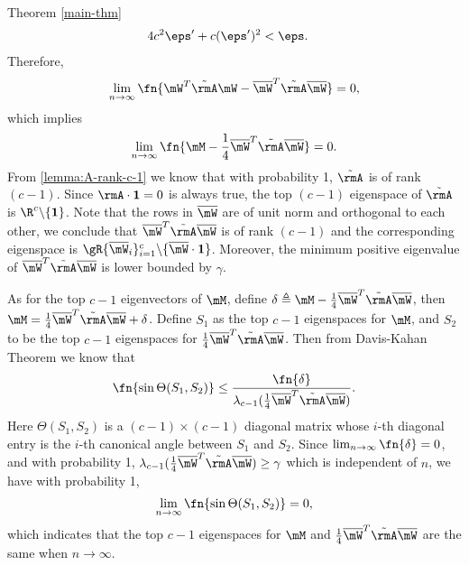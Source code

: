 \begin{proofof}{Theorem \cref{main-thm}}
\begin{equation}
\begin{split}
                                                             &4c^2\eps'+c(\eps')^2 < \eps.
\end{split}\end{equation}
Therefore,
\begin{equation}
    \lim_{n\to\infty}\fn{\mW^T\tilde{\rmA}\mW - \overline{\mW}^T\tilde{\rmA}\overline{\mW}} = 0,
\end{equation}
which implies
\begin{equation}
    \lim_{n\to\infty}\fn{\mM - \frac14\overline{\mW}^T\tilde{\rmA}\overline{\mW}} = 0.
\end{equation}
From \cref{lemma:A-rank-c-1} we know that with probability 1, $\tilde{\rmA}$ is of rank $(c-1)$. Since $\rmA\cdot\textbf{1}=0$ is always true, the top $(c-1)$ eigenspace of $\tilde{\rmA}$ is $\R^c\backslash\{\textbf{1}\}$. Note that the rows in $\overline{\mW}$ are of unit norm and orthogonal to each other, we conclude that $\overline{\mW}^T\tilde{\rmA}\overline{\mW}$ is of rank $(c-1)$ and the corresponding eigenspace is $\gR\{\overline{\mW}_i\}_{i=1}^c\backslash\{\overline{\mW}\cdot\textbf{1}\}$. Moreover, the minimum positive eigenvalue of $\overline{\mW}^T\tilde{\rmA}\overline{\mW}$ is lower bounded by $\gamma$.

As for the top $c-1$ eigenvectors of $\mM$, define $\delta\triangleq\mM-\frac14\overline{\mW}^T\tilde{\rmA}\overline{\mW}$, then $\mM = \frac14\overline{\mW}^T\tilde{\rmA}\overline{\mW} + \delta$. Define $S_1$ as the top $c-1$ eigenspaces for $\mM$, and $S_2$ to be the top $c-1$ eigenspaces for $\frac14\overline{\mW}^T\tilde{\rmA}\overline{\mW}$. Then from Davis-Kahan Theorem we know that
\begin{equation}
    \fn{\sin\Theta(S_1,S_2)}\leq\frac{\fn{\delta}}{\lambda_{c-1}(\frac14\overline{\mW}^T\tilde{\rmA}\overline{\mW})}.
\end{equation}
Here $\Theta(S_1,S_2)$ is a $(c-1)\times(c-1)$ diagonal matrix whose $i$-th diagonal entry is the $i$-th canonical angle between $S_1$ and $S_2$. Since $\lim_{n\to\infty}\fn{\delta}=0$, and with probability 1, $\lambda_{c-1}(\frac14\overline{\mW}^T\tilde{\rmA}\overline{\mW})\geq\gamma$ which is independent of $n$, we have with probability 1,
\begin{equation}
    \lim_{n\to\infty}\fn{\sin\Theta(S_1,S_2)} = 0,
\end{equation}
which indicates that the top $c-1$ eigenspaces for $\mM$ and $\frac14\overline{\mW}^T\tilde{\rmA}\overline{\mW}$ are the same when $n\to\infty$.


\end{proofof}

